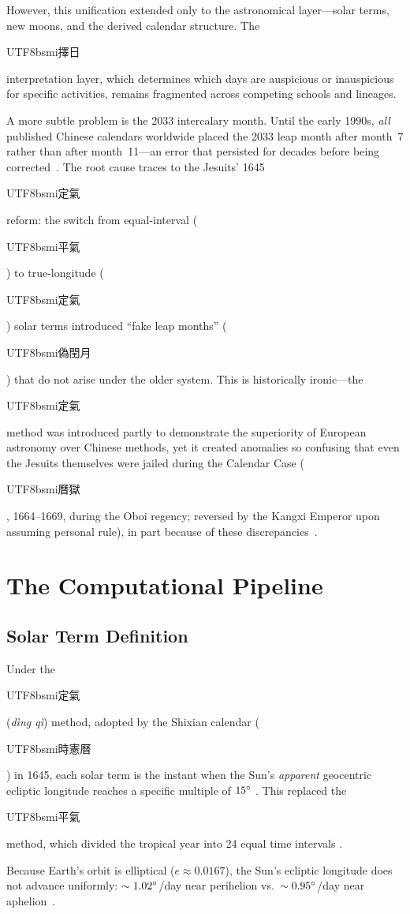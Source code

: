 \documentclass[10pt,a4paper]{article}
\newcommand{\zh}[1]{\begin{CJK}{UTF8}{bsmi}#1\end{CJK}}
\begin{document}
However, this unification extended only to the astronomical
layer---solar terms, new moons, and the derived calendar structure.  The
\zh{擇日} interpretation layer, which determines which days are auspicious
or inauspicious for specific activities, remains fragmented across competing
schools and lineages.

A more subtle problem is the 2033 intercalary month.  Until the early
1990s, \emph{all} published Chinese calendars worldwide placed the 2033
leap month after month~7 rather than after month~11---an error that
persisted for decades before being
corrected~\cite{aslaksen_fake, wikipedia_2033}.  The root cause traces to
the Jesuits' 1645 \zh{定氣} reform: the switch from equal-interval
(\zh{平氣}) to true-longitude (\zh{定氣}) solar terms introduced
``fake leap months'' (\zh{偽閏月}) that do not arise under the older
system.  This is historically ironic---the \zh{定氣} method was introduced
partly to demonstrate the superiority of European astronomy over Chinese
methods, yet it created anomalies so confusing that even the Jesuits
themselves were jailed during the Calendar Case (\zh{曆獄}, 1664--1669, during the Oboi regency;
reversed by the Kangxi Emperor upon assuming personal rule), in
part because of these discrepancies~\cite{sivin2009, udias1994}.


\section{The Computational Pipeline}
\label{sec:background}

\subsection{Solar Term Definition}

Under the \zh{定氣} (\textit{d\`{i}ng q\`{i}}) method, adopted by the
Shixian calendar (\zh{時憲曆}) in 1645, each solar term is the instant when
the Sun's \emph{apparent} geocentric ecliptic longitude reaches a specific
multiple of $15\degree$ \cite{aslaksen2010, ytliu_rules}. This replaced the
\zh{平氣} method, which divided the tropical year into 24 equal time
intervals \cite{ytliu_solarterms}.

Because Earth's orbit is elliptical ($e \approx 0.0167$), the Sun's ecliptic
longitude does not advance uniformly: $\sim 1.02\degree$/day near perihelion
vs.\ $\sim 0.95\degree$/day near aphelion~\cite{meeus1998}.
\end{document}
